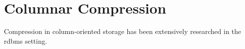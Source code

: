 \chapter{Columnar Compression}
\label{columnar-compression}

Compression in column-oriented storage has been extensively researched \cite{abadi-col-comp, abadi-sparse-col} in the \gls{rdbms} setting. 